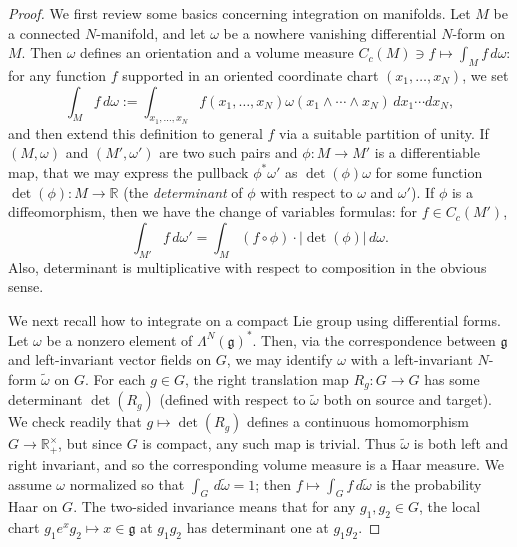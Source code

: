 \documentclass[reqno]{amsart} 
\begin{document}
\begin{proof}
  We first review some basics concerning integration on manifolds.  Let $M$ be a connected $N$-manifold, and let $\omega$ be a nowhere vanishing differential $N$-form on $M$.  Then $\omega$ defines an orientation and a volume measure $C_c(M) \ni f \mapsto \int_M f \, d \omega$: for any function $f$ supported in an oriented coordinate chart $(x_1,\dotsc,x_N)$, we set
  \begin{equation}\label{eq:}
    \int_M f \, d \omega :=
    \int_{x_1,\dotsc,x_N}
    f(x_1,\dotsc,x_N)
    \omega(x_1 \wedge \dotsb \wedge x_N)
    \, d x_1 \dotsb d x_N,
  \end{equation}
  and then extend this definition to general $f$ via a suitable partition of unity.  If $(M,\omega)$ and $(M',\omega ')$ are two such pairs and $\phi : M \rightarrow M'$ is a differentiable map, that we may express the pullback $\phi^* \omega '$ as $\det(\phi) \omega$ for some function $\det(\phi) : M \rightarrow \mathbb{R}$ (the \emph{determinant} of $\phi$ with respect to $\omega$ and $\omega '$).  If $\phi$ is a diffeomorphism, then we have the change of variables formulas: for $f \in C_c(M')$,
  \begin{equation}\label{eq:change-of-vars}
    \int_{M'}
    f \, d \omega ' = \int_M (f \circ \phi) \cdot |\det(\phi)| \, d \omega.
  \end{equation}
  Also, determinant is multiplicative with respect to composition in the obvious sense.

  We next recall how to integrate on a compact Lie group using differential forms.  Let $\omega$ be a nonzero element of $\Lambda^N(\mathfrak{g})^*$.  Then, via the correspondence between $\mathfrak{g}$ and left-invariant vector fields on $G$, we may identify $\omega$ with a left-invariant $N$-form $\tilde{\omega}$ on $G$.  For each $g \in G$, the right translation map $R_g : G \rightarrow G$ has some determinant $\det(R_g)$ (defined with respect to $\tilde{\omega}$ both on source and target).  We check readily that $g \mapsto \det(R_g)$ defines a continuous homomorphism $G \rightarrow \mathbb{R}^\times_+$, but since $G$ is compact, any such map is trivial.  Thus $\tilde{\omega}$ is both left and right invariant, and so the corresponding volume measure is a Haar measure.  We assume $\omega$ normalized so that $\int_G \, d \tilde{\omega} = 1$; then $f \mapsto \int_G f \, d \tilde{\omega}$ is the probability Haar on $G$.  The two-sided invariance means that for any $g_1, g_2 \in G$, the local chart $g_1 e^x g_2 \mapsto x \in \mathfrak{g}$ at $g_1 g_2$ has determinant one at $g_1 g_2$.


\end{proof}
\end{document}
